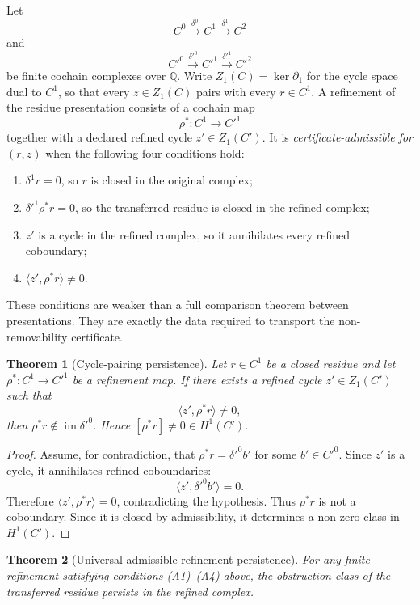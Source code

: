 \documentclass[11pt]{article}
\newtheorem{theorem}{Theorem}[section]
\newcommand{\im}{\operatorname{im}}
\newcommand{\Q}{\mathbb{Q}}
\begin{document}
Let
\[
C^0 \xrightarrow{\delta^0} C^1 \xrightarrow{\delta^1} C^2
\]
and
\[
C'^0 \xrightarrow{\delta'^0} C'^1 \xrightarrow{\delta'^1} C'^2
\]
be finite cochain complexes over \(\Q\). Write \(Z_1(C)=\ker \partial_1\) for the cycle space dual to \(C^1\), so that every \(z\in Z_1(C)\) pairs with every \(r\in C^1\). A refinement of the residue presentation consists of a cochain map
\[
\rho^*:C^1\longrightarrow C'^1
\]
together with a declared refined cycle \(z'\in Z_1(C')\). It is \emph{certificate-admissible for \((r,z)\)} when the following four conditions hold:
\begin{enumerate}[label=(A\arabic*)]
\item \(\delta^1 r=0\), so \(r\) is closed in the original complex;
\item \(\delta'^1\rho^*r=0\), so the transferred residue is closed in the refined complex;
\item \(z'\) is a cycle in the refined complex, so it annihilates every refined coboundary;
\item \(\langle z',\rho^*r\rangle\neq 0\).
\end{enumerate}
These conditions are weaker than a full comparison theorem between presentations. They are exactly the data required to transport the non-removability certificate.

\begin{theorem}[Cycle-pairing persistence]
\label{thm:witness-persistence}
Let \(r\in C^1\) be a closed residue and let \(\rho^*:C^1\to C'^1\) be a refinement map. If there exists a refined cycle \(z'\in Z_1(C')\) such that
\[
\langle z',\rho^*r\rangle\neq 0,
\]
then \(\rho^*r\notin \im\delta'^0\). Hence \([\rho^*r]\neq 0\in H^1(C')\).
\end{theorem}

\begin{proof}
Assume, for contradiction, that \(\rho^*r=\delta'^0 b'\) for some \(b'\in C'^0\). Since \(z'\) is a cycle, it annihilates refined coboundaries:
\[
\langle z',\delta'^0 b'\rangle=0.
\]
Therefore \(\langle z',\rho^*r\rangle=0\), contradicting the hypothesis. Thus \(\rho^*r\) is not a coboundary. Since it is closed by admissibility, it determines a non-zero class in \(H^1(C')\).
\end{proof}

\begin{theorem}[Universal admissible-refinement persistence]
\label{thm:universal-persistence}
For any finite refinement satisfying conditions \emph{(A1)}--\emph{(A4)} above, the obstruction class of the transferred residue persists in the refined complex.
\end{theorem}
\end{document}
